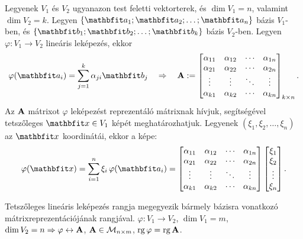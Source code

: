 \documentclass{szb-practice}
\begin{document}
\begin{blueBox}
  Legyenek $V_1$ és $V_2$ ugyanazon test feletti vektorterek, és $\dim V_1 = n$,
  valamint $\dim V_2 = k$. Legyen $\{ \rvec a_1; \rvec a_2; \ldots; \rvec a_n \}$
  bázis $V_1$-ben, és $\{ \rvec b_1; \rvec b_2; \ldots; \rvec b_k \}$ bázis
  $V_2$-ben. Legyen $\varphi: V_1 \rightarrow V_2$ lineáris leképezés, ekkor
  $$
    \varphi(\rvec a_i)
    = \sum_{j=1}^{k} \alpha_{ji} \rvec b_j
    \quad\Rightarrow\quad
    \rmat A := \begin{bmatrix}
      \alpha_{11} & \alpha_{12} & \cdots & \alpha_{1n} \\
      \alpha_{21} & \alpha_{22} & \cdots & \alpha_{2n} \\
      \vdots      & \vdots      & \ddots & \vdots      \\
      \alpha_{k1} & \alpha_{k2} & \cdots & \alpha_{kn}
    \end{bmatrix}_{k \times n}
    \text.
  $$
  Az $\mathbf{A}$ mátrixot $\varphi$ leképezést reprezentáló mátrixnak hívjuk,
  segítségével tetszőleges $\rvec x \in V_1$ képét meghatározhatjuk. Legyenek
  $(\xi_1, \xi_2, \ldots, \xi_n)$ az $\rvec x$ koordinátái, ekkor a képe:
  $$
    \varphi(\rvec x)
    = \sum_{i=1}^{n} \xi_i \,\varphi(\rvec a_i)
    =
    \begin{bmatrix}
      \alpha_{11} & \alpha_{12} & \cdots & \alpha_{1n} \\
      \alpha_{21} & \alpha_{22} & \cdots & \alpha_{2n} \\
      \vdots      & \vdots      & \ddots & \vdots      \\
      \alpha_{k1} & \alpha_{k2} & \cdots & \alpha_{kn}
    \end{bmatrix}
    \begin{bmatrix}
      \xi_1  \\
      \xi_2  \\
      \vdots \\
      \xi_n
    \end{bmatrix}
    \text.
  $$
\end{blueBox}

\begin{statement}
  Tetszőleges lineáris leképezés rangja megegyezik bármely bázisra vonatkozó
  mátrixreprezentációjának rangjával. $\varphi: V_1 \rightarrow V_2$, $\dim V_1
    = m$, $\dim V_2 = n \Rightarrow \varphi \leftrightarrow \mathbf{A}$, $\mathbf{A}
    \in \mathcal M_{n \times m}$, $\operatorname{rg} \varphi = \operatorname{rg} \mathbf{A}$.
\end{statement}
\end{document}
